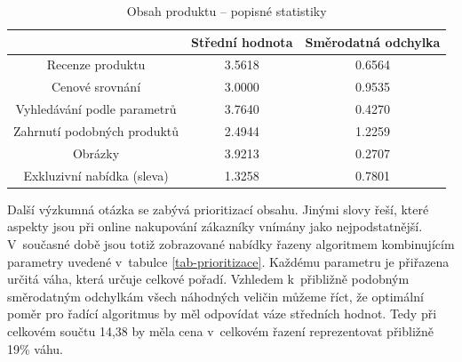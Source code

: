 \documentclass[12pt,twoside,openany]{fithesis}
\begin{document}
\begin{table}[htb]
    \begin{center}%
        \begin{tabular}{|c|c|c|}
            \hline 
            {{}} & {{Střední hodnota}} & {{Směrodatná odchylka}} 
\tabularnewline
             \hline 
             {{Recenze produktu}} & {{3.5618}} & {{0.6564}} \tabularnewline
              \hline 
              {{Cenové srovnání}} & {{3.0000}} & {{0.9535}} \tabularnewline
               \hline 
               {{Vyhledávání podle parametrů}} & {{3.7640}} & {{0.4270}} 
\tabularnewline
                \hline 
                {{Zahrnutí podobných produktů}} & {{2.4944}} & {{1.2259}} 
\tabularnewline
                 \hline 
                 {{Obrázky}} & {{3.9213}} & {{0.2707}} \tabularnewline
                  \hline 
                  {{Exkluzivní nabídka (sleva)}} & {{1.3258}} & {{0.7801}} 
\tabularnewline
                  \hline 
              \end{tabular}
              \caption{Obsah produktu -- popisné statistiky}\label{tobsah}
          \end{center}
      \end{table}

      Další výzkumná otázka se zabývá prioritizací obsahu. Jinými 
slovy řeší, které aspekty jsou při online nakupování zákazníky 
vnímány jako nejpodstatnější. V~současné době jsou totiž zobrazované 
nabídky řazeny algoritmem kombinujícím parametry uvedené v~tabulce 
\hyperlink{tab-prioritizace}{\ref{tab-prioritizace}}. Každému parametru je přiřazena určitá 
váha, která určuje celkové pořadí. Vzhledem k~přibližně podobným 
směrodatným odchylkám všech náhodných veličin můžeme říct, že 
optimální poměr pro řadící algoritmus by měl odpovídat váze 
středních hodnot. Tedy při celkovém součtu 14,38 by měla cena v~celkovém 
řazení reprezentovat přibližně 19\% váhu.
\end{document}
